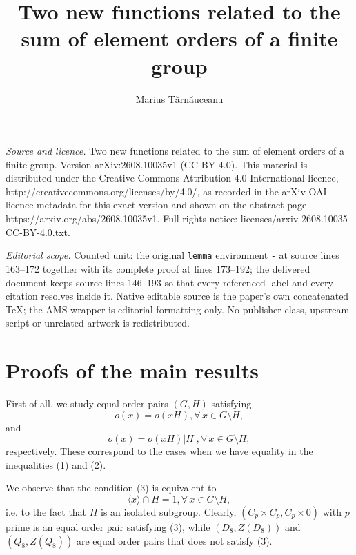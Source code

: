 \documentclass[10pt,a4paper]{amsart}
\newcommand{\0}{{\leqno}}
\begin{document}
\title[Two new functions related to the sum of element orders of a ]{Two new functions related to the sum of element orders of a finite group}
\author{Marius Tărnăuceanu}
\date{}
\maketitle
\noindent\emph{Source and licence.} Two new functions related to the sum of element orders of a finite group. Version arXiv:2608.10035v1 (CC BY 4.0). This material is distributed under the Creative Commons Attribution 4.0 International licence, http://creativecommons.org/licenses/by/4.0/, as recorded in the arXiv OAI licence metadata for this exact version and shown on the abstract page https://arxiv.org/abs/2608.10035v1. Full rights notice: licenses/arxiv-2608.10035-CC-BY-4.0.txt.\par\smallskip
\noindent\textit{Editorial scope.} Counted unit: the original \texttt{lemma} environment \texttt{-} at source lines 163--172 together with its complete proof at lines 173--192; the delivered document keeps source lines 146--193 so that every referenced label and every citation resolves inside it. Native editable source is the paper's own concatenated TeX; the AMS wrapper is editorial formatting only. No publisher class, upstream script or unrelated artwork is redistributed.
\section{Proofs of the main results}

First of all, we study equal order pairs $(G,H)$ satisfying
\begin{equation}
o(x)=o(xH), \forall\, x\in G\setminus H,
\end{equation}and
\begin{equation}
o(x)=o(xH)|H|, \forall\, x\in G\setminus H,
\end{equation}respectively. These correspond to the cases when we have equality in the inequalities (1) and (2).

We observe that the condition (3) is equivalent to
\begin{equation}
\langle x\rangle\cap H=1, \forall\, x\in G\setminus H,\nonumber
\end{equation}i.e. to the fact that $H$ is an isolated subgroup. Clearly, $(C_p\times C_p,C_p\times 0)$ with $p$ prime is an equal order pair satisfying (3), while $(D_8,Z(D_8))$ and $(Q_8,Z(Q_8))$ are equal order pairs that does not satisfy (3).
\end{document}
